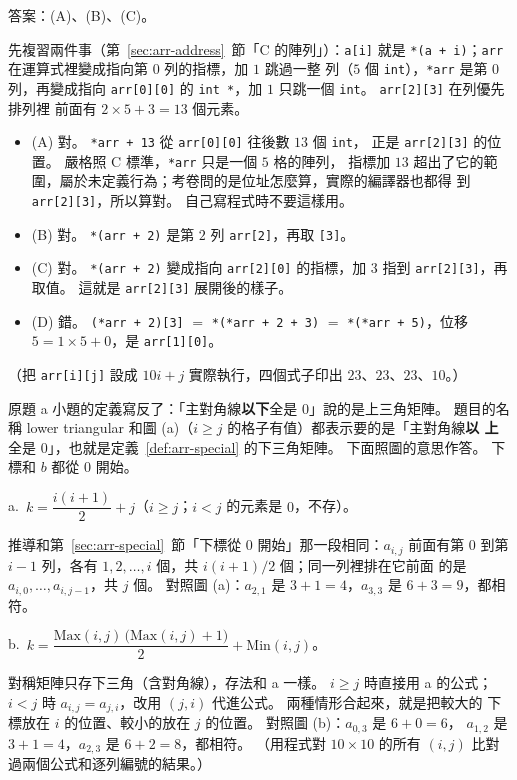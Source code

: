 答案：(A)、(B)、(C)。

先複習兩件事（第~\ref{sec:arr-address}~節「C 的陣列」）：\texttt{a[i]} 就是
\texttt{*(a + i)}；\texttt{arr} 在運算式裡變成指向第 $0$ 列的指標，加 $1$ 跳過一整
列（$5$ 個 \texttt{int}），\texttt{*arr} 是第 $0$ 列，再變成指向 \texttt{arr[0][0]}
的 \texttt{int *}，加 $1$ 只跳一個 \texttt{int}。 \texttt{arr[2][3]} 在列優先排列裡
前面有 $2 \times 5 + 3 = 13$ 個元素。
\begin{itemize}
\item (A) 對。 \texttt{*arr + 13} 從 \texttt{arr[0][0]} 往後數 $13$ 個 \texttt{int}，
正是 \texttt{arr[2][3]} 的位置。 嚴格照 C 標準，\texttt{*arr} 只是一個 $5$ 格的陣列，
指標加 $13$ 超出了它的範圍，屬於未定義行為；考卷問的是位址怎麼算，實際的編譯器也都得
到 \texttt{arr[2][3]}，所以算對。 自己寫程式時不要這樣用。
\item (B) 對。 \texttt{*(arr + 2)} 是第 $2$ 列 \texttt{arr[2]}，再取 \texttt{[3]}。
\item (C) 對。 \texttt{*(arr + 2)} 變成指向 \texttt{arr[2][0]} 的指標，加 $3$ 指到
\texttt{arr[2][3]}，再取值。 這就是 \texttt{arr[2][3]} 展開後的樣子。
\item (D) 錯。 \texttt{(*arr + 2)[3]} $=$ \texttt{*(*arr + 2 + 3)} $=$
\texttt{*(*arr + 5)}，位移 $5 = 1 \times 5 + 0$，是 \texttt{arr[1][0]}。
\end{itemize}
（把 \texttt{arr[i][j]} 設成 $10i + j$ 實際執行，四個式子印出 $23$、$23$、$23$、$10$。）

原題 a 小題的定義寫反了：「主對角線\textbf{以下}全是 $0$」說的是上三角矩陣。 題目的名
稱 lower triangular 和圖 (a)（$i \ge j$ 的格子有值）都表示要的是「主對角線\textbf{以
上}全是 $0$」，也就是定義~\ref{def:arr-special} 的下三角矩陣。 下面照圖的意思作答。
下標和 $b$ 都從 $0$ 開始。

a.\ $k = \dfrac{i(i+1)}{2} + j$（$i \ge j$；$i < j$ 的元素是 $0$，不存）。

推導和第~\ref{sec:arr-special}~節「下標從 $0$ 開始」那一段相同：$a_{i,j}$ 前面有第
$0$ 到第 $i - 1$ 列，各有 $1, 2, \ldots, i$ 個，共 $i(i+1)/2$ 個；同一列裡排在它前面
的是 $a_{i,0}, \ldots, a_{i,j-1}$，共 $j$ 個。 對照圖 (a)：$a_{2,1}$ 是
$3 + 1 = 4$，$a_{3,3}$ 是 $6 + 3 = 9$，都相符。

b.\ $k = \dfrac{\mathrm{Max}(i,j)\,\bigl(\mathrm{Max}(i,j) + 1\bigr)}{2} + \mathrm{Min}(i,j)$。

對稱矩陣只存下三角（含對角線），存法和 a 一樣。 $i \ge j$ 時直接用 a 的公式；
$i < j$ 時 $a_{i,j} = a_{j,i}$，改用 $(j, i)$ 代進公式。 兩種情形合起來，就是把較大的
下標放在 $i$ 的位置、較小的放在 $j$ 的位置。 對照圖 (b)：$a_{0,3}$ 是 $6 + 0 = 6$，
$a_{1,2}$ 是 $3 + 1 = 4$，$a_{2,3}$ 是 $6 + 2 = 8$，都相符。 （用程式對 $10 \times 10$
的所有 $(i, j)$ 比對過兩個公式和逐列編號的結果。）

